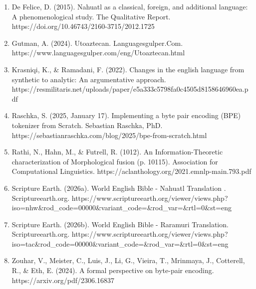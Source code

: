 \documentclass[11pt]{article}
\begin{document}
\begin{enumerate}
    \item De Felice, D. (2015). Nahuatl as a classical, foreign, and additional language: A phenomenological study. The Qualitative Report. https://doi.org/10.46743/2160-3715/2012.1725

    \item Gutman, A. (2024). Utoaztecan. Languagesgulper.Com. https://www.languagesgulper.com/eng/Utoaztecan.html

    \item Krasniqi, K., \& Ramadani, F. (2022). Changes in the english language from synthetic to analytic: An argumentative approach. https://resmilitaris.net/uploads/paper/e5a333c5798fa0c4505d8158646960ea.pdf

    \item Raschka, S. (2025, January 17). Implementing a byte pair encoding (BPE) tokenizer from Scratch. Sebastian Raschka, PhD. https://sebastianraschka.com/blog/2025/bpe-from-scratch.html

    \item Rathi, N., Hahn, M., \& Futrell, R. (1012). An Information-Theoretic characterization of Morphological fusion (p. 10115). Association for Computational Linguistics. https://aclanthology.org/2021.emnlp-main.793.pdf

    \item Scripture Earth. (2026a). World English Bible - Nahuatl Translation . Scriptureearth.org. https://www.scriptureearth.org/viewer/views.php?iso=nhw\&rod\_code=00000&variant\_code=\&rod\_var=\&rtl=0\&st=eng

    \item Scripture Earth. (2026b). World English Bible - Raramuri Translation. Scriptureearth.org. https://www.scriptureearth.org/viewer/views.php?iso=tac\&rod\_code=00000&variant\_code=&rod\_var=\&rtl=0\&st=eng

    \item Zouhar, V., Meister, C., Luis, J., Li, G., Vieira, T., Mrinmaya, J., Cotterell, R., \& Eth, E. (2024). A formal perspective on byte-pair encoding. https://arxiv.org/pdf/2306.16837

\end{enumerate}
\end{document}
